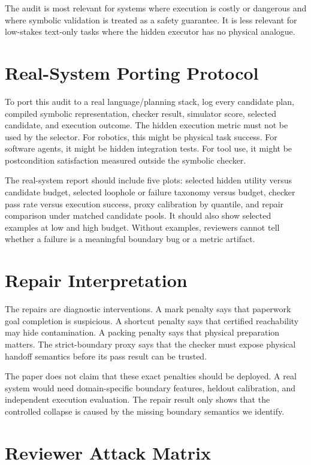 \documentclass{article}
\begin{document}
The audit is most relevant for systems where execution is costly or dangerous
and where symbolic validation is treated as a safety guarantee. It is less
relevant for low-stakes text-only tasks where the hidden executor has no
physical analogue.

\section{Real-System Porting Protocol}

To port this audit to a real language/planning stack, log every candidate plan,
compiled symbolic representation, checker result, simulator score, selected
candidate, and execution outcome. The hidden execution metric must not be used
by the selector. For robotics, this might be physical task success. For
software agents, it might be hidden integration tests. For tool use, it might
be postcondition satisfaction measured outside the symbolic checker.

The real-system report should include five plots: selected hidden utility
versus candidate budget, selected loophole or failure taxonomy versus budget,
checker pass rate versus execution success, proxy calibration by quantile, and
repair comparison under matched candidate pools. It should also show selected
examples at low and high budget. Without examples, reviewers cannot tell
whether a failure is a meaningful boundary bug or a metric artifact.

\section{Repair Interpretation}

The repairs are diagnostic interventions. A mark penalty says that paperwork
goal completion is suspicious. A shortcut penalty says that certified
reachability may hide contamination. A packing penalty says that physical
preparation matters. The strict-boundary proxy says that the checker must
expose physical handoff semantics before its pass result can be trusted.

The paper does not claim that these exact penalties should be deployed. A real
system would need domain-specific boundary features, heldout calibration, and
independent execution evaluation. The repair result only shows that the
controlled collapse is caused by the missing boundary semantics we identify.

\section{Reviewer Attack Matrix}
\end{document}
